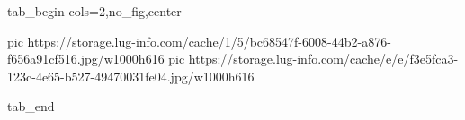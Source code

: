  
 
 
 
 


\ifcmt
  tab_begin cols=2,no_fig,center

     pic https://storage.lug-info.com/cache/1/5/bc68547f-6008-44b2-a876-f656a91cf516.jpg/w1000h616%
     pic https://storage.lug-info.com/cache/e/e/f3e5fca3-123c-4e65-b527-49470031fe04.jpg/w1000h616%

  tab_end
\fi
